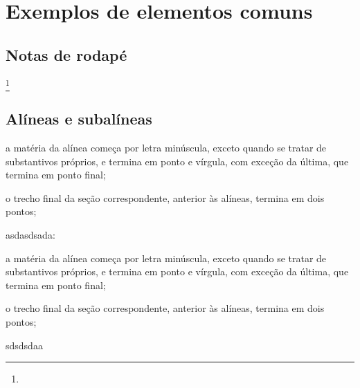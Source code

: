 \chapter{Exemplos de elementos comuns}
\section{Notas de rodapé}
  \lipsum[10-10]\footnote{\lipsum*[11-11]}

\section{Alíneas e subalíneas}
  \lipsum[1-1]
  \begin{alinea}
    \item a matéria da alínea começa por letra minúscula, exceto quando se tratar de     substantivos próprios, e termina em ponto e vírgula, com exceção da última, que termina em ponto final; 
    \item o trecho final da seção correspondente, anterior às alíneas, termina em
    dois pontos;
    \item asdasdsada: 
    \begin{subalinea}
      \item a matéria da alínea começa por letra minúscula, exceto quando se tratar de     substantivos próprios, e termina em ponto e vírgula, com exceção da última, que termina em ponto final; 
      \item o trecho final da seção correspondente, anterior às alíneas, termina em
      dois pontos;
    \end{subalinea}
    \item sdsdsdaa
  \end{alinea}


